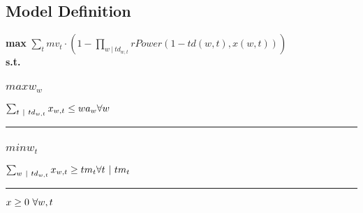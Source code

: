 \documentclass[11pt]{article}
\begin{document}
\subsection*{Model Definition}
\textbf{max} $\sum_{t} mv_{t} \cdot (1 - \prod_{w ~ | ~ td_{w,t}} rPower(1 - td(w,t),x(w,t)))$\\
\textbf{s.t.}
\subsubsection*{$maxw_{w}$}
$
\sum_{t ~ | ~ td_{w,t}} x_{w,t} \leq wa_{w}\hfill \forall w
$
\vspace{5pt}
\hrule
\subsubsection*{$minw_{t}$}
$
\sum_{w ~ | ~ td_{w,t}} x_{w,t} \geq tm_{t}\hfill \forall t ~ | ~ tm_{t}
$
\vspace{5pt}
\hrule
\bigskip
$x\geq 0 ~ \forall w,t\\$
\end{document}
